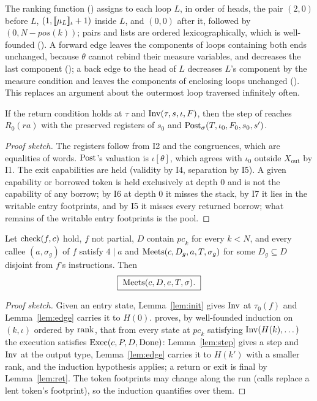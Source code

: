 The ranking function () assigns to each loop $L$, in order of heads, the pair $(2,0)$ before $L$, $(1,[\![\mu_L]\!]_{\iota}+1)$ inside $L$, and $(0,0)$ after it, followed by $(0,N-\mathit{pos}(k))$; pairs and lists are ordered lexicographically, which is well-founded (). A forward edge leaves the components of loops containing both ends unchanged, because $\theta$ cannot rebind their measure variables, and decreases the last component (); a back edge to the head of $L$ decreases $L$'s component by the measure condition and leaves the components of enclosing loops unchanged (). This replaces an argument about the outermost loop traversed infinitely often.

\begin{lem}\label{lem:ret}
If the return condition holds at $\tau$ and $\mathrm{Inv}(\tau,s,\iota,F)$, then the step of  reaches $R_0(\mathit{ra})$ with the preserved registers of $s_0$ and $\mathrm{Post}_\sigma(T,\iota_0,F_0,s_0,s')$.
\end{lem}
\begin{proof}[Proof sketch]
The registers follow from I2 and the congruences, which are equalities of words. $\mathrm{Post}$'s valuation is $\iota[\theta]$, which agrees with $\iota_0$ outside $X_{\mathrm{out}}$ by I1. The exit capabilities are held (validity by I4, separation by I5). A given capability or borrowed token is held exclusively at depth $0$ and is not the capability of any borrow; by I6 at depth $0$ it misses the stack, by I7 it lies in the writable entry footprints, and by I5 it misses every returned borrow; what remains of the writable entry footprints is the pool.
\end{proof}

\begin{claim}\label{thm:check}
Let $\mathrm{check}(f,c)$ hold, $f$ not partial, $D$ contain $\mathit{pc}_k$ for every $k<N$, and every callee $(a,\sigma_g)$ of $f$ satisfy $4\mid a$ and $\mathrm{Meets}(c,D_g,a,T,\sigma_g)$ for some $D_g\subseteq D$ disjoint from $f$'s instructions. Then
\[
\boxed{\;\mathrm{Meets}(c,D,e,T,\sigma).\;}
\]
\end{claim}
\begin{proof}[Proof sketch]
Given an entry state, Lemma~\ref{lem:init} gives $\mathrm{Inv}$ at $\tau_0(f)$ and Lemma~\ref{lem:edge} carries it to $H(0)$.  proves, by well-founded induction on $(k,\iota)$ ordered by $\mathrm{rank}$, that from every state at $\mathit{pc}_k$ satisfying $\mathrm{Inv}(H(k),\dots)$ the execution satisfies $\mathrm{Exec}(c,P,D,\mathrm{Done})$: Lemma~\ref{lem:step} gives a step and $\mathrm{Inv}$ at the output type, Lemma~\ref{lem:edge} carries it to $H(k')$ with a smaller rank, and the induction hypothesis applies; a return or exit is final by Lemma~\ref{lem:ret}. The token footprints may change along the run (calls replace a lent token's footprint), so the induction quantifies over them.
\end{proof}

